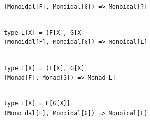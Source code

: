 \documentclass{beamer}
\begin{document}
\begin{frame}[fragile]

  \centering
  \large

  \begin{minipage}{9.95\textwidth}
    \begin{verbatim}

      (Monoidal[F], Monoidal[G]) => Monoidal[?]

    \end{verbatim}
  \end{minipage}

\end{frame}

\begin{frame}[fragile]

  \centering
  \large

  \begin{minipage}{0.95\textwidth}
    \begin{verbatim}

      type L[X] = (F[X], G[X])
      (Monoidal[F], Monoidal[G]) => Monoidal[L]

    \end{verbatim}
  \end{minipage}

\end{frame}

\begin{frame}[fragile]

  \centering
  \large

  \begin{minipage}{0.80\textwidth}
    \begin{verbatim}

      type L[X] = (F[X], G[X])
      (Monad[F], Monad[G]) => Monad[L]

    \end{verbatim}
  \end{minipage}

\end{frame}

\begin{frame}[fragile]

  \centering
  \large

  \begin{minipage}{0.95\textwidth}
    \begin{verbatim}

      type L[X] = F[G[X]]
      (Monoidal[F], Monoidal[G]) => Monoidal[L]

    \end{verbatim}
  \end{minipage}

\end{frame}
\end{document}
